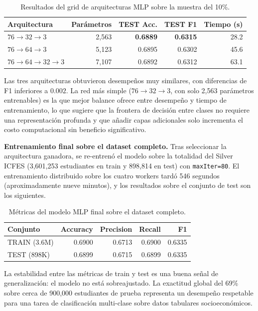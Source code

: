 \begin{table}[H]
\centering
\caption{Resultados del grid de arquitecturas MLP sobre la muestra del 10\%.}
\begin{tabular}{l r r r r}
\toprule
\textbf{Arquitectura} & \textbf{Parámetros} & \textbf{TEST Acc.} & \textbf{TEST F1} & \textbf{Tiempo (s)} \\
\midrule
$76 \rightarrow 32 \rightarrow 3$              & 2,563 & \textbf{0.6889} & \textbf{0.6315} & 28.2 \\
$76 \rightarrow 64 \rightarrow 3$              & 5,123 & 0.6895 & 0.6302 & 45.6 \\
$76 \rightarrow 64 \rightarrow 32 \rightarrow 3$ & 7,107 & 0.6892 & 0.6312 & 63.1 \\
\bottomrule
\end{tabular}
\end{table}

Las tres arquitecturas obtuvieron desempeños muy similares, con diferencias de F1 inferiores a $0.002$. La red más simple ($76 \rightarrow 32 \rightarrow 3$, con solo 2,563 parámetros entrenables) es la que mejor balance ofrece entre desempeño y tiempo de entrenamiento, lo que sugiere que la frontera de decisión entre clases no requiere una representación profunda y que añadir capas adicionales solo incrementa el costo computacional sin beneficio significativo.

\textbf{Entrenamiento final sobre el dataset completo.} Tras seleccionar la arquitectura ganadora, se re-entrenó el modelo sobre la totalidad del Silver ICFES (3,601,253 estudiantes en train y 898,814 en test) con \texttt{maxIter=80}. El entrenamiento distribuido sobre los cuatro workers tardó 546 segundos (aproximadamente nueve minutos), y los resultados sobre el conjunto de test son los siguientes.

\begin{table}[H]
\centering
\caption{Métricas del modelo MLP final sobre el dataset completo.}
\begin{tabular}{l r r r r}
\toprule
\textbf{Conjunto} & \textbf{Accuracy} & \textbf{Precision} & \textbf{Recall} & \textbf{F1} \\
\midrule
TRAIN (3.6M) & 0.6900 & 0.6713 & 0.6900 & 0.6335 \\
TEST  (898K) & 0.6899 & 0.6715 & 0.6899 & 0.6335 \\
\bottomrule
\end{tabular}
\end{table}

La estabilidad entre las métricas de train y test es una buena señal de generalización: el modelo no está sobreajustado. La exactitud global del 69\% sobre cerca de 900,000 estudiantes de prueba representa un desempeño respetable para una tarea de clasificación multi-clase sobre datos tabulares socioeconómicos.

